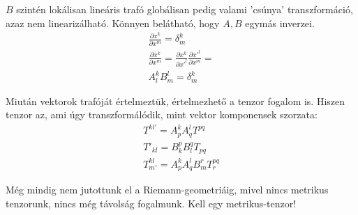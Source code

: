 \documentclass[a4paper,12pt]{article}
\begin{document}
\par $B$ szintén lokálisan lineáris trafó globálisan pedig valami 'csúnya' transzformáció, azaz nem linearizálható. Könnyen belátható, hogy $A,B$ egymás inverzei.
\begin{gather*}
    \frac{\partial x^{k}}{\partial x^{m}} = \delta^{k}_{m} \\
    \frac{\partial x^{k}}{\partial x^{m}} = \frac{\partial x^{k}}{\partial x'^{l}}\frac{\partial x'^{l}}{\partial x^{m}} = \\
    A^{k}_{l}B^{l}_{m} = \delta^{k}_{m}
\end{gather*}
\par Miután vektorok trafóját értelmeztük, értelmezhető a tenzor fogalom is. Hiszen tenzor az, ami úgy transzformálódik, mint vektor komponensek szorzata:
\begin{gather*}
    T^{kl\prime} = A^{k}_{p}A^{l}_{q}T^{pq} \\
    T'_{kl} = B_{k}^{p}B_{l}^{q}T_{pq} \\
    T^{kl}_{m\prime} = A^{k}_{p} A^{l}_{q} B^{r}_{m} T^{pq}_{r}
\end{gather*}
\par Még mindig nem jutottunk el a Riemann-geometriáig, mivel nincs metrikus tenzorunk, nincs még távolság fogalmunk. Kell egy metrikus-tenzor!
\end{document}
